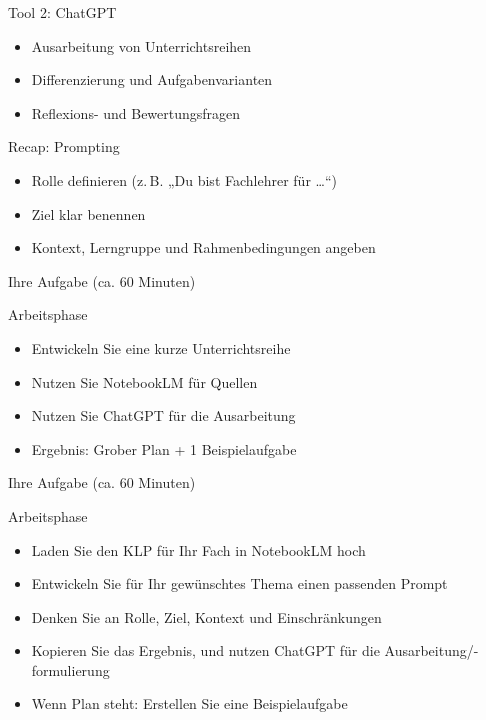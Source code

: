 \documentclass[14pt, aspectratio=169]{beamer}
\begin{document}
\begin{frame}{Tool 2: ChatGPT}
\begin{itemize}
    \item Ausarbeitung von Unterrichtsreihen
    \item Differenzierung und Aufgabenvarianten
    \item Reflexions- und Bewertungsfragen
\end{itemize}
\end{frame}

\begin{frame}{Recap: Prompting}
\begin{itemize}
    \item Rolle definieren (z.\,B. „Du bist Fachlehrer für …“)
    \item Ziel klar benennen
    \item Kontext, Lerngruppe und Rahmenbedingungen angeben
\end{itemize}
\end{frame}

\begin{frame}{Ihre Aufgabe (ca. 60 Minuten)}
\begin{block}{Arbeitsphase}
\begin{itemize}
    \item Entwickeln Sie eine kurze Unterrichtsreihe
    \item Nutzen Sie NotebookLM für Quellen
    \item Nutzen Sie ChatGPT für die Ausarbeitung
    \item Ergebnis: Grober Plan + 1 Beispielaufgabe
\end{itemize}
\end{block}
\end{frame}

\begin{frame}{Ihre Aufgabe (ca. 60 Minuten)}
\begin{block}{Arbeitsphase}
\begin{itemize}
    \item Laden Sie den KLP für Ihr Fach in NotebookLM hoch
    \item Entwickeln Sie für Ihr gewünschtes Thema einen passenden Prompt
    \item Denken Sie an Rolle, Ziel, Kontext und Einschränkungen
    \item Kopieren Sie das Ergebnis, und nutzen ChatGPT für die Ausarbeitung/-formulierung
    \item Wenn Plan steht: Erstellen Sie eine Beispielaufgabe
\end{itemize}
\end{block}
\end{frame}
\end{document}

